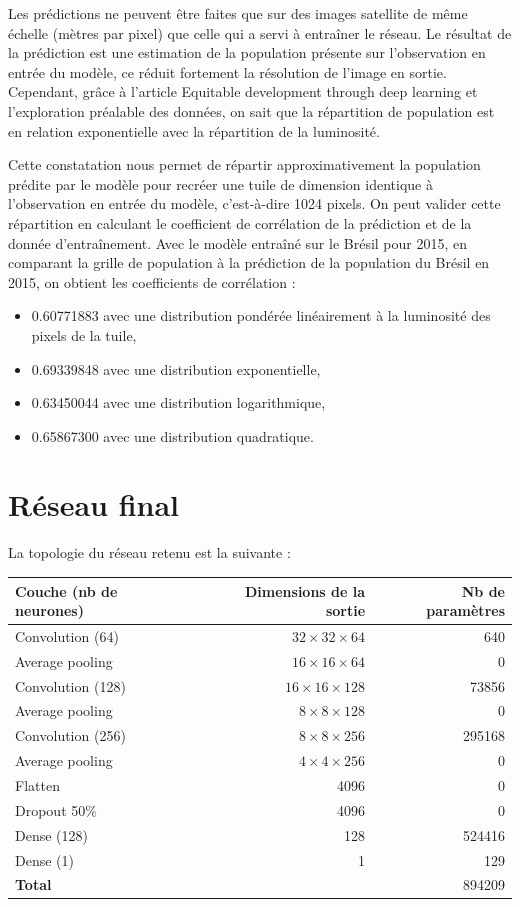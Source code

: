 \documentclass[a4paper, 11pt]{report}
\begin{document}
Les prédictions ne peuvent être faites que sur des images satellite de même échelle (mètres par pixel) que celle qui a servi à entraîner le réseau. Le résultat de la prédiction est une estimation de la population présente sur l'observation en entrée du modèle, ce réduit fortement la résolution de l'image en sortie. Cependant, grâce à l'article Equitable development through deep learning \cite{netpop-article} et l'exploration préalable des données, on sait que la répartition de population est en relation exponentielle avec la répartition de la luminosité.

Cette constatation nous permet de répartir approximativement la population prédite par le modèle pour recréer une tuile de dimension identique à l'observation en entrée du modèle, c'est-à-dire 1024 pixels. On peut valider cette répartition en calculant le coefficient de corrélation de la prédiction et de la donnée d'entraînement. Avec le modèle entraîné sur le Brésil pour 2015, en comparant la grille de population à la prédiction de la population du Brésil en 2015, on obtient les coefficients de corrélation :

\begin{itemize}
	\item 0.60771883 avec une distribution pondérée linéairement à la luminosité des pixels de la tuile,
	\item 0.69339848 avec une distribution exponentielle,
	\item 0.63450044 avec une distribution logarithmique,
	\item 0.65867300 avec une distribution quadratique.
\end{itemize}

\section{Réseau final}
\label{Réseaufinal}

La topologie du réseau retenu est la suivante :

\begin{tabular}{ l r r }
	\hline
	\textbf{Couche (nb de neurones)} & \textbf{Dimensions de la sortie} & \textbf{Nb de paramètres} \\
	\hline\hline
	Convolution (64) & $32 \times 32 \times 64$ & 640 \\
	\hline
	Average pooling & $16 \times 16 \times 64$ & 0 \\
	\hline
	Convolution (128) & $16 \times 16 \times 128$ & 73856 \\
	\hline
	Average pooling & $8 \times 8 \times 128$ & 0 \\
	\hline
	Convolution (256) & $8 \times 8 \times 256$ & 295168 \\
	\hline
	Average pooling & $4 \times 4 \times 256$ & 0 \\
	\hline
	Flatten & 4096 & 0 \\
	\hline
	Dropout 50\% & 4096 & 0 \\
	\hline
	Dense (128) & 128 & 524416 \\
	\hline
	Dense (1) & 1 & 129 \\
	\hline\hline
	\textbf{Total} &  & 894209 \\
	\hline
\end{tabular}
\end{document}
